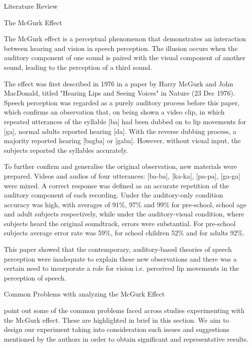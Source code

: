 \documentclass{article}
\begin{document}
\begin{psection}{Literature Review}
	\begin{psubsection}{The McGurk Effect}

		The McGurk effect is a perceptual phenomenon that demonstrates an interaction between hearing and vision in speech perception. The illusion occurs when the auditory component of one sound is paired with the visual component of another sound, leading to the perception of a third sound. 

		The effect was first described in 1976 in a paper by Harry McGurk and John MacDonald, titled "Hearing Lips and Seeing Voices" \cite{original} in Nature (23 Dec 1976). Speech perception was regarded as a purely auditory process before this paper, which confirms an observation that, on being shown a video clip, in which repeated utterances of the syllable [ba] had been dubbed on to lip movements for [ga], normal adults reported hearing [da]. With the reverse dubbing process, a majority reported hearing [bagba] or [gaba].
		However, without visual input, the subjects reported the syllables accurately.

		To further confirm and generalise the original observation, new materials were prepared. Videos and audios of four utterances: [ba-ba], [ka-ka], [pa-pa], [ga-ga] were mixed. A correct response was defined as an accurate repetition of the auditory component of each recording. Under the auditory-only condition accuracy was high, with averages of 91\%, 97\% and 99\%  for pre-school, school age and adult subjects respectively, while under the auditory-visual condition, where subjects heard the original soundtrack, errors were substantial. For pre-school subjects average error rate was 59\%, for school children 52\% and for adults 92\%.

		This paper showed that the contemporary, auditory-based theories of speech perception were inadequate to explain these new observations and there was a certain need to incorporate a role for vision i.e. perceived lip movements in the perception of speech. 

	\end{psubsection}

	\begin{psubsection}{Common Problems with analyzing the McGurk Effect}

		\cite{40-years} point out some of the common problems faced across studies experimenting with the McGurk effect. These are highlighted in brief in this section. We aim to design our experiment taking into consideration such issues and suggestions mentioned by the authors in order to obtain significant and representative results.


\end{psubsection}
\end{psection}
\end{document}
